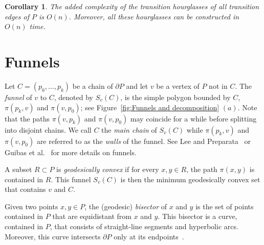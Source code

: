 \documentclass[a4paper]{article}
\newtheorem{corollary}[theorem]{Corollary}
\newcommand{\fn}[2]{\ensuremath{S_{\scriptscriptstyle #1}(#2)}}
\newcommand{\p}[2]{\ensuremath{\pi(#1, #2)}}
\begin{document}
\begin{corollary}\label{corollary: Hourglass partition}
The added complexity of the transition hourglasses of all transition edges of $P$ is $O(n)$.
Moreover, all these hourglasses can be constructed in $O(n)$ time.
\end{corollary}

\section{Funnels}\label{section:Building Funnels}

Let $C = (p_0, \ldots, p_k)$ be a chain of $\partial P$ and let $v$ be a vertex of $P$ not in $C$.
The \emph{funnel} of $v$ to $C$, denoted by $\fn{v}{C}$, is the simple polygon bounded by $C$, $\p{p_k}{v}$ and $\p{v}{p_0}$; see Figure~\ref{fig:Funnels and decomposition} $(a)$. 
Note that the paths $\p{v}{p_k}$ and $\p{v}{p_0}$ may coincide for a while before splitting into disjoint chains. 
We call $C$ the \emph{main chain} of $\fn{v}{C}$ while $\p{p_k}{v}$ and $\p{v}{p_0}$ are referred to as the \emph{walls} of the funnel.  
See Lee and Preparata~\cite{lee1984euclidean} or Guibas et al.~\cite{guibasShortestPathTree} for more details on funnels.

A subset $R\subset P$ is \emph{geodesically convex} if for every $x,y\in R$, the path $\p{x}{y}$ is contained in $R$.
This funnel $\fn{v}{C}$ is then the minimum geodesically convex set that contains $v$ and $C$.

Given two points $x,y\in P$, the (geodesic) \emph{bisector} of $x$ and $y$ is the set of points contained in $P$ that are equidistant from $x$ and $y$. This bisector is a curve, contained in $P$, that consists of straight-line segments and hyperbolic arcs. Moreover, this curve intersects $\partial P$ only at its endpoints~\cite[Lemma 3.22]{aronov1989geodesic}.
\end{document}
